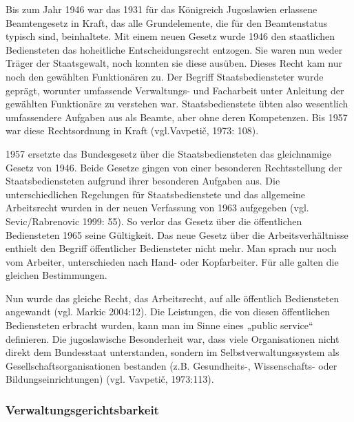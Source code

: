 Bis zum Jahr 1946 war das 1931 für das Königreich Jugoslawien erlassene Beamtengesetz in Kraft, das alle Grundelemente, die für den Beamtenstatus typisch sind, beinhaltete. Mit einem neuen Gesetz wurde 1946 den staatlichen Bediensteten das hoheitliche Entscheidungsrecht entzogen. Sie waren nun weder Träger der Staatsgewalt, noch konnten sie diese ausüben. Dieses Recht kam nur noch den gewählten Funktionären zu. Der Begriff Staatsbediensteter wurde geprägt, worunter umfassende Verwaltungs- und Facharbeit unter Anleitung der gewählten Funktionäre zu verstehen war. Staatsbedienstete übten also wesentlich umfassendere Aufgaben aus als Beamte, aber ohne deren Kompetenzen. Bis 1957 war diese Rechtsordnung in Kraft (vgl.Vavpetič, 1973: 108).\par
1957 ersetzte das Bundesgesetz über die Staatsbediensteten das gleichnamige Gesetz von 1946. Beide Gesetze gingen von einer besonderen Rechtsstellung der Staatsbediensteten aufgrund ihrer besonderen Aufgaben aus. Die unterschiedlichen Regelungen für Staatsbedienstete und das allgemeine Arbeitsrecht wurden in der neuen Verfassung von 1963 aufgegeben (vgl. Sevic/Rabrenovic 1999: 55). So verlor das Gesetz über die öffentlichen Bediensteten 1965 seine Gültigkeit. Das neue Gesetz über die Arbeitsverhältnisse enthielt den Begriff öffentlicher Bediensteter nicht mehr. Man sprach nur noch vom Arbeiter, unterschieden nach Hand- oder Kopfarbeiter. Für alle galten die gleichen Bestimmungen. \par
Nun wurde das gleiche Recht, das Arbeitsrecht, auf alle öffentlich Bediensteten angewandt (vgl. Markic 2004:12). Die Leistungen, die von diesen öffentlichen Bediensteten erbracht wurden, kann man im Sinne eines „public service“ definieren. Die jugoslawische Besonderheit war, dass viele Organisationen nicht direkt dem Bundesstaat unterstanden, sondern im Selbstverwaltungssystem als Gesellschaftsorganisationen bestanden (z.B. Gesundheits-, Wissenschafts- oder Bildungseinrichtungen) (vgl. Vavpetič, 1973:113).

\subsubsection{Verwaltungsgerichtsbarkeit }

